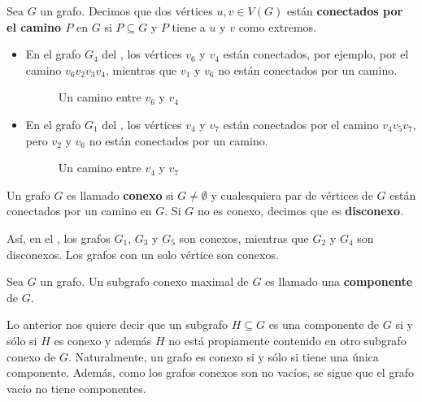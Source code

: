 \begin{Def}
   Sea $G$ un grafo. Decimos que dos vértices $u,v\in V(G)$ están \textbf{conectados por el camino $P$} en $G$ si $P\subseteq G$ y $P$ tiene a $u$ y $v$ como extremos.
\end{Def}
\begin{Ejm}
   \phantom{o}
   \begin{itemize}
      \item En el grafo $G_4$ del , los vértices $v_6$ y $v_4$ están conectados, por ejemplo, por el camino $v_6v_2v_3v_4$, mientras que $v_1$ y $v_6$ no están conectados por un camino.
      \begin{figure}[H]
        \centering
          \resizebox{0.2\textwidth}{!}{}
        \caption{Un camino entre $v_6$ y $v_4$}
      \end{figure}
      \item En el grafo $G_1$ del , los vértices $v_4$ y $v_7$ están conectados por el camino $v_4v_5v_7$, pero $v_2$ y $v_6$ no están conectados por un camino.
      \begin{figure}[H]
        \centering
          \resizebox{0.3\textwidth}{!}{}
        \caption{Un camino entre $v_4$ y $v_7$}
      \end{figure}
   \end{itemize}
\end{Ejm}
\begin{Def}
   Un grafo $G$ es llamado \textbf{conexo} si $G\neq \emptyset$ y cualesquiera par de vértices  de $G$ están conectados por un camino en $G$. Si $G$ no es conexo, decimos que es \textbf{disconexo}. 
\end{Def}
Así, en el , los grafos $G_1$, $G_3$ y $G_5$ son conexos, mientras que $G_2$ y $G_4$ son disconexos. Los grafos con un solo vértice son conexos.
\begin{Def}
   Sea $G$ un grafo. Un subgrafo conexo maximal de $G$ es llamado una \textbf{componente} de $G$. 
\end{Def}
Lo anterior nos quiere decir que un subgrafo $H\subseteq G$ es una componente de $G$ si y sólo si $H$ es conexo y además $H$ no está propiamente contenido en otro subgrafo conexo de $G$. Naturalmente, un grafo es conexo si y sólo si tiene una única componente. Además, como los grafos conexos son no vacíos, se sigue que el grafo vacío no tiene componentes.
